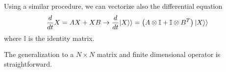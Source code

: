 Using a similar procedure, we can vectorize also the differential equation
\begin{equation}
    \frac{d}{dt}X = AX + XB \rightarrow \frac{d}{dt}\lvert X\rangle\rangle = \left(A\otimes \mathbb{I} + \mathbb{I} \otimes B^T\right)\lvert X\rangle\rangle
\end{equation}
where $\mathbb{I}$ is the identity matrix.

The generalization to a $N \times N$ matrix and finite dimensional operator is straightforward.